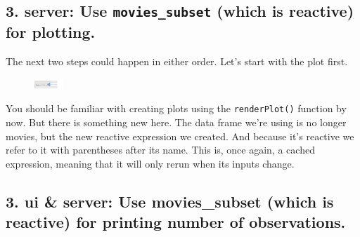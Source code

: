 \documentclass[
  letterpaper,
  DIV=11,
  numbers=noendperiod]{scrreprt}
\newenvironment{Shaded}{\begin{snugshade}}{\end{snugshade}}
\newcommand{\AttributeTok}[1]{\textcolor[rgb]{0.40,0.46,0.14}{#1}}
\newcommand{\CommentTok}[1]{\textcolor[rgb]{0.37,0.37,0.37}{#1}}
\newcommand{\FunctionTok}[1]{\textcolor[rgb]{0.28,0.35,0.67}{#1}}
\newcommand{\NormalTok}[1]{\textcolor[rgb]{0.00,0.46,0.62}{#1}}
\newcommand{\OtherTok}[1]{\textcolor[rgb]{0.00,0.46,0.62}{#1}}
\newcommand{\SpecialCharTok}[1]{\textcolor[rgb]{0.37,0.37,0.37}{#1}}
\begin{document}
\hypertarget{server-use-movies_subset-which-is-reactive-for-plotting.}{%
\subsection{\texorpdfstring{3. \textbf{server:} Use
\texttt{movies\_subset} (which is reactive) for
plotting.}{3. server: Use movies\_subset (which is reactive) for plotting.}}\label{server-use-movies_subset-which-is-reactive-for-plotting.}}

The next two steps could happen in either order. Let's start with the
plot first.

\begin{figure}

\includegraphics[width=0.1\textwidth,height=\textheight]{./images/output.png} \hfill{}

\end{figure}

\begin{Shaded}
\end{Shaded}

You should be familiar with creating plots using the
\texttt{renderPlot()} function by now. But there is something new here.
The data frame we're using is no longer movies, but the new reactive
expression we created. And because it's reactive we refer to it with
parentheses after its name. This is, once again, a cached expression,
meaning that it will only rerun when its inputs change.

\hypertarget{ui-server-use-movies_subset-which-is-reactive-for-printing-number-of-observations.}{%
\subsection{\texorpdfstring{3. \textbf{ui} \& \textbf{server:} Use
movies\_subset (which is reactive) for printing number of
observations.}{3. ui \& server: Use movies\_subset (which is reactive) for printing number of observations.}}\label{ui-server-use-movies_subset-which-is-reactive-for-printing-number-of-observations.}}
\end{document}

